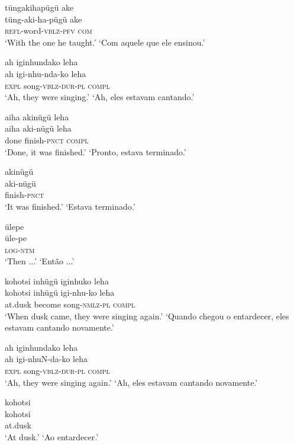 \documentclass[output=paper,
modfonts,nonflat
]{langsci/langscibook}
\begin{document}
\ea  tüngakihapügü ake\\[.3em]
\gll tüng-aki-ha-pügü ake\\
     \textsc{refl}-word-\textsc{vblz}-\textsc{pfv} \textsc{com}\\
\glt ‘With the one he taught.’
\glt ‘Com aquele que ele ensinou.’
\z

\ea  ah iginhundako leha\\[.3em]
\gll ah igi-nhu-nda-ko leha\\
     \textsc{expl} song-\textsc{vblz}-\textsc{dur}-\textsc{pl} \textsc{compl}\\
\glt ‘Ah, they were singing.’
\glt ‘Ah, eles estavam cantando.’
\z

\ea  aiha akinügü leha\\[.3em]
\gll aiha aki-nügü leha\\
     done finish-\textsc{pnct} \textsc{compl}\\
\glt ‘Done, it was finished.’
\glt ‘Pronto, estava terminado.’
\z

\ea  akinügü\\[.3em]
\gll aki-nügü\\
     finish-\textsc{pnct}\\
\glt ‘It was finished.’
\glt ‘Estava terminado.’
\z

\ea  ülepe\\[.3em]
\gll üle-pe\\
     \textsc{log}-\textsc{ntm}\\
\glt ‘Then ...’
\glt ‘Então ...’
\z

\ea  kohotsi inhügü iginhuko leha\\[.3em]
\gll kohotsi inhügü igi-nhu-ko leha\\
     at.dusk become song-\textsc{nmlz}-\textsc{pl} \textsc{compl}\\
\glt ‘When dusk came, they were singing again.’
\glt ‘Quando chegou o entardecer, eles estavam cantando novamente.’
\z

\ea  ah iginhundako leha\\[.3em]
\gll ah igi-nhuN-da-ko leha\\
     \textsc{expl} song-\textsc{vblz}-\textsc{dur}-\textsc{pl} \textsc{compl}\\
\glt ‘Ah, they were singing again.’
\glt ‘Ah, eles estavam cantando novamente.’
\z

\ea  kohotsi\\[.3em]
\gll kohotsi\\
     at.dusk\\
\glt ‘At dusk.’
\glt ‘Ao entardecer.’
\z
\end{document}
